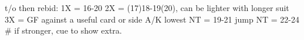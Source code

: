 t/o then rebid:
1X = 16-20
2X = (17)18-19(20), can be lighter with longer suit
3X = GF against a useful card or side A/K
lowest NT = 19-21
jump NT = 22-24
# if stronger, cue to show extra.